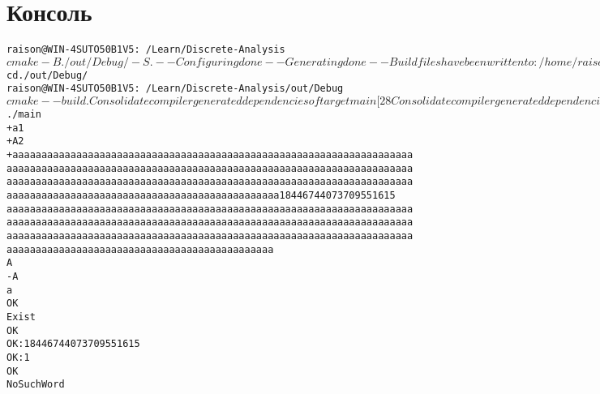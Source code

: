 \section{Консоль}
\begin{alltt}
raison@WIN-4SUTO50B1V5:~/Learn/Discrete-Analysis$ cmake -B ./out/Debug/ -S .
-- Configuring done
-- Generating done
-- Build files have been written to: /home/raison/Learn/Discrete-Analysis/out/Debug
raison@WIN-4SUTO50B1V5:~/Learn/Discrete-Analysis$ cd ./out/Debug/
raison@WIN-4SUTO50B1V5:~/Learn/Discrete-Analysis/out/Debug$ cmake --build .
Consolidate compiler generated dependencies of target main
[ 28%] Built target main
Consolidate compiler generated dependencies of target main_test
[100%] Built target main_test
raison@WIN-4SUTO50B1V5:~/Learn/Discrete-Analysis/out/Debug$ ./main
+ a 1
+ A 2
+ aaaaaaaaaaaaaaaaaaaaaaaaaaaaaaaaaaaaaaaaaaaaaaaaaaaaaaaaaaaaaaaaaaaaaaaaaaaaaaaaaaaaaaaaaaaaaaaaaaaaaaaaaaaaaaaaaaaaaaaaaaaaaaaaaaaaaaaaaaaaaaaaaaaaaaaaaaaaaaaaaaaaaaaaaaaaaaaaaaaaaaaaaaaaaaaaaaaaaaaaaaaaaaaaaaaaaaaaaaaaaaaaaaaaaaaaaaaaaaaaaaaaaaaaaaaaaaaa 18446744073709551615
aaaaaaaaaaaaaaaaaaaaaaaaaaaaaaaaaaaaaaaaaaaaaaaaaaaaaaaaaaaaaaaaaaaaaaaaaaaaaaaaaaaaaaaaaaaaaaaaaaaaaaaaaaaaaaaaaaaaaaaaaaaaaaaaaaaaaaaaaaaaaaaaaaaaaaaaaaaaaaaaaaaaaaaaaaaaaaaaaaaaaaaaaaaaaaaaaaaaaaaaaaaaaaaaaaaaaaaaaaaaaaaaaaaaaaaaaaaaaaaaaaaaaaaaaaaaaaaa
A
- A
a
OK
Exist
OK
OK: 18446744073709551615
OK: 1
OK
NoSuchWord
\end{alltt}
\pagebreak

